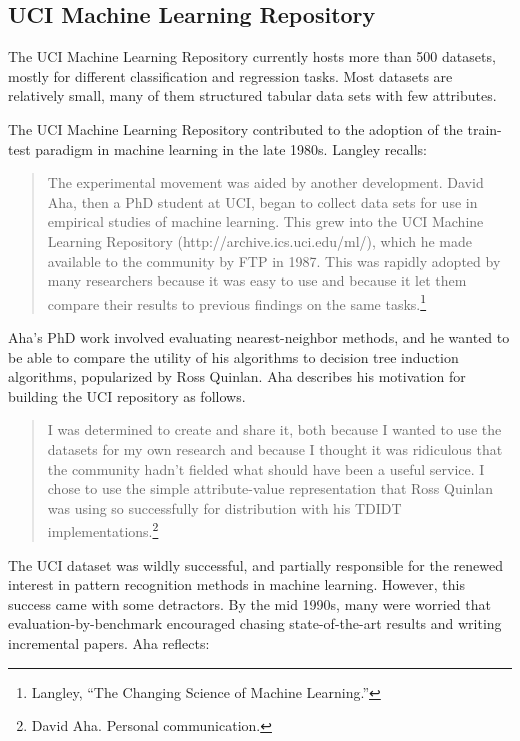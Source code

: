 \documentclass{tufte-book}
\begin{document}
\hypertarget{uci-machine-learning-repository}{%
\subsection{UCI Machine Learning
Repository}\label{uci-machine-learning-repository}}

The UCI Machine Learning Repository currently hosts more than 500
datasets, mostly for different classification and regression tasks. Most
datasets are relatively small, many of them structured tabular data sets
with few attributes.

The UCI Machine Learning Repository contributed to the adoption of the
train-test paradigm in machine learning in the late 1980s. Langley
recalls:

\begin{quote}
The experimental movement was aided by another development. David Aha,
then a PhD student at UCI, began to collect data sets for use in
empirical studies of machine learning. This grew into the UCI Machine
Learning Repository (http://archive.ics.uci.edu/ml/), which he made
available to the community by FTP in 1987. This was rapidly adopted by
many researchers because it was easy to use and because it let them
compare their results to previous findings on the same tasks.\footnote{Langley,
  {``The Changing Science of Machine Learning.''}}
\end{quote}

Aha's PhD work involved evaluating nearest-neighbor methods, and he
wanted to be able to compare the utility of his algorithms to decision
tree induction algorithms, popularized by Ross Quinlan. Aha describes
his motivation for building the UCI repository as follows.

\begin{quote}
I was determined to create and share it, both because I wanted to use
the datasets for my own research and because I thought it was ridiculous
that the community hadn't fielded what should have been a useful
service. I chose to use the simple attribute-value representation that
Ross Quinlan was using so successfully for distribution with his TDIDT
implementations.\footnote{David Aha. Personal communication.}
\end{quote}

The UCI dataset was wildly successful, and partially responsible for the
renewed interest in pattern recognition methods in machine learning.
However, this success came with some detractors. By the mid 1990s, many
were worried that evaluation-by-benchmark encouraged chasing
state-of-the-art results and writing incremental papers. Aha reflects:
\end{document}
